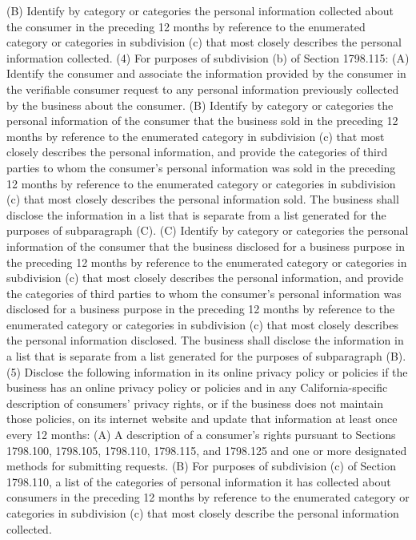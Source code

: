 (B) Identify by category or categories the personal information collected about the consumer in the preceding 12 months by reference to the enumerated category or categories in subdivision (c) that most closely describes the personal information collected.
(4) For purposes of subdivision (b) of Section 1798.115:
(A) Identify the consumer and associate the information provided by the consumer in the verifiable consumer request to any personal information previously collected by the business about the consumer.
(B) Identify by category or categories the personal information of the consumer that the business sold in the preceding 12 months by reference to the enumerated category in subdivision (c) that most closely describes the personal information, and provide the categories of third parties to whom the consumer’s personal information was sold in the preceding 12 months by reference to the enumerated category or categories in subdivision (c) that most closely describes the personal information sold. The business shall disclose the information in a list that is separate from a list generated for the purposes of subparagraph (C).
(C) Identify by category or categories the personal information of the consumer that the business disclosed for a business purpose in the preceding 12 months by reference to the enumerated category or categories in subdivision (c) that most closely describes the personal information, and provide the categories of third parties to whom the consumer’s personal information was disclosed for a business purpose in the preceding 12 months by reference to the enumerated category or categories in subdivision (c) that most closely describes the personal information disclosed. The business shall disclose the information in a list that is separate from a list generated for the purposes of subparagraph (B).
(5) Disclose the following information in its online privacy policy or policies if the business has an online privacy policy or policies and in any California-specific description of consumers’ privacy rights, or if the business does not maintain those policies, on its internet website and update that information at least once every 12 months:
(A) A description of a consumer’s rights pursuant to Sections 1798.100, 1798.105, 1798.110, 1798.115, and 1798.125 and one or more designated methods for submitting requests.
(B) For purposes of subdivision (c) of Section 1798.110, a list of the categories of personal information it has collected about consumers in the preceding 12 months by reference to the enumerated category or categories in subdivision (c) that most closely describe the personal information collected.
